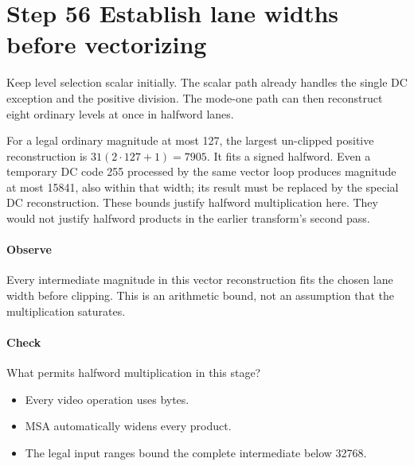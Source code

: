\section{Step 56 Establish lane widths before vectorizing}\label{h263-quant-s06}
Keep level selection scalar initially. The scalar path already handles the
single DC exception and the positive division. The mode-one path can then
reconstruct eight ordinary levels at once in halfword lanes.

For a legal ordinary magnitude at most 127, the largest un-clipped positive
reconstruction is $31(2\cdot127+1)=7905$. It fits a signed halfword. Even a
temporary DC code 255 processed by the same vector loop produces magnitude at
most 15841, also within that width; its result must be replaced by the special
DC reconstruction. These bounds justify halfword multiplication here. They would
not justify halfword products in the earlier transform's second pass.

\paragraph{Observe} Every intermediate magnitude in this vector reconstruction
fits the chosen lane width before clipping. This is an arithmetic bound, not an
assumption that the multiplication saturates.
\paragraph{Check} What permits halfword multiplication in this stage?
\begin{itemize}
  \item[A.] Every video operation uses bytes.
  \item[B.] MSA automatically widens every product.
  \item[C.] The legal input ranges bound the complete intermediate below 32768.
\end{itemize}
